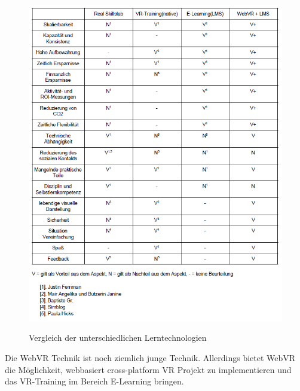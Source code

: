 \begin{figure}[ht]
\vspace*{1em}
\centering
\caption{Vergleich der unterschiedlichen Lerntechnologien}
\includegraphics[width=\textwidth]{images/standDerForschungTabelle.png}
\label{fig:standDerForschungTabelle} 
\end{figure}

Die WebVR Technik ist noch ziemlich junge Technik. Allerdings bietet WebVR die Möglichkeit, webbasiert cross-platform VR Projekt zu implementieren und das VR-Training im Bereich E-Learning bringen.



